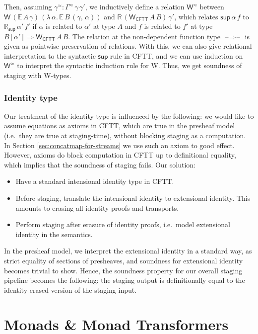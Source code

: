 \documentclass[acmsmall,screen,review,anonymous]{acmart}
\newcommand{\msf}[1]{{\mathsf{#1}}}
\newcommand{\mbb}[1]{\mathbb{#1}}
\newcommand{\lam}{\lambda\,}
\newcommand{\blank}{{\mathord{\hspace{1pt}\text{--}\hspace{1pt}}}}
\theoremstyle{remark}
\newcommand{\RA}{\Rightarrow}
\begin{document}
Then, assuming $\gamma^{\approx} : \Gamma^{\approx}\,\gamma\,\gamma'$, we
inductively define a relation $\msf{W}^{\approx}$ between
$\msf{W}\,(\mbb{E}\,A\,\gamma)\,(\lam \alpha.\,\mbb{E}\,B\,(\gamma,\,\alpha))$
and $\mbb{R}\,(\msf{W_{CFTT}}\,A\,B)\,\gamma'$, which relates
$\msf{sup}\,\alpha\,f$ to $\mathbb{R}_{\msf{sup}}\,\alpha'\,f'$ if $\alpha$ is
related to $\alpha'$ at type $A$ and $f$ is related to $f'$ at type $B[\alpha']
\RA \msf{W_{CFTT}}\,A\,B$. The relation at the non-dependent function type $\blank{\RA}\blank$
is given as pointwise preservation of relations. With this, we can also give
relational interpretation to the syntactic $\msf{sup}$ rule in CFTT,
and we can use induction on $\msf{W}^{\approx}$ to interpret the syntactic
induction rule for W. Thus, we get soundness of staging with W-types.

\subsubsection{Identity type} Our treatment of the identity type is
influenced by the following: we would like to assume equations as axioms in
CFTT, which are true in the presheaf model (i.e.\ they are true at
staging-time), without blocking staging as a computation. In Section \ref{sec:concatmap-for-streams}
we use such an axiom to good effect. However, axioms do block computation in
CFTT up to definitional equality, which implies that the soundness of staging
fails. Our solution:
\begin{itemize}
\item Have a standard intensional identity type in CFTT.
\item Before staging, translate the intensional identity to extensional
      identity. This amounts to erasing all identity proofs and transports.
\item Perform staging after erasure of identity proofs, i.e.\ model extensional identity in the semantics.
\end{itemize}
In the presheaf model, we interpret the extensional identity in a standard way,
as strict equality of sections of presheaves, and soundness for extensional
identity becomes trivial to show. Hence, the soundness property for our overall
staging pipeline becomes the following: the staging output is definitionally
equal to the identity-erased version of the staging input.

\section{Monads \& Monad Transformers}\label{sec:monad-transformers}
\end{document}
